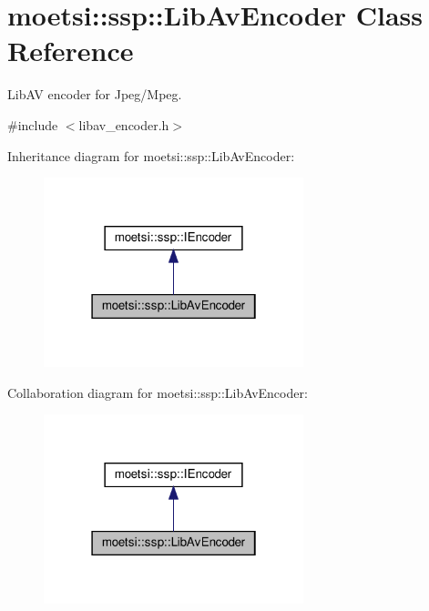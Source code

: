 \hypertarget{classmoetsi_1_1ssp_1_1LibAvEncoder}{}\section{moetsi\+:\+:ssp\+:\+:Lib\+Av\+Encoder Class Reference}
\label{classmoetsi_1_1ssp_1_1LibAvEncoder}


Lib\+AV encoder for Jpeg/\+Mpeg.  




{\ttfamily \#include $<$libav\+\_\+encoder.\+h$>$}



Inheritance diagram for moetsi\+:\+:ssp\+:\+:Lib\+Av\+Encoder\+:
\nopagebreak
\begin{figure}[H]
\begin{center}
\leavevmode
\includegraphics[width=214pt]{classmoetsi_1_1ssp_1_1LibAvEncoder__inherit__graph}
\end{center}
\end{figure}


Collaboration diagram for moetsi\+:\+:ssp\+:\+:Lib\+Av\+Encoder\+:
\nopagebreak
\begin{figure}[H]
\begin{center}
\leavevmode
\includegraphics[width=214pt]{classmoetsi_1_1ssp_1_1LibAvEncoder__coll__graph}
\end{center}
\end{figure}
